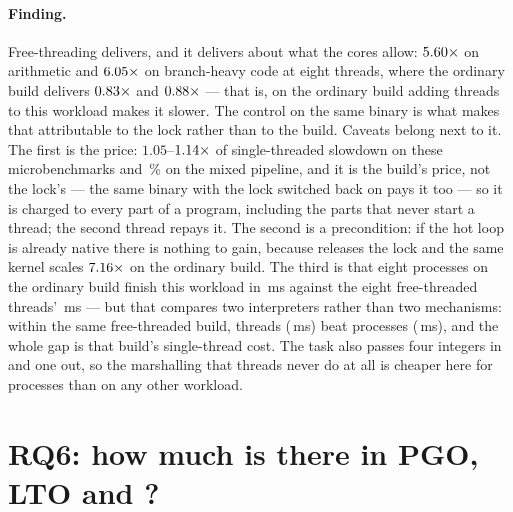 \paragraph{Finding.} Free-threading delivers, and it delivers about what the cores allow:
$\meas{ratio:b4_threads-ft:py_arith/ft/T1_control|b4_threads-ft:py_arith/ft/T8}{5.60}\times$ on arithmetic and $\meas{ratio:b4_threads-ft:py_branchy/ft/T1|b4_threads-ft:py_branchy/ft/T8}{6.05}\times$ on branch-heavy code at eight threads, where the
ordinary build delivers $\meas{ratio:b4_threads-gil:py_arith/gil/T1_control|b4_threads-gil:py_arith/gil/T8}{0.83}\times$ and $\meas{ratio:b4_threads-gil:py_branchy/gil/T1_control|b4_threads-gil:py_branchy/gil/T8}{0.88}\times$ --- that is, on the ordinary build adding
threads to this workload makes it slower. The  control on the same binary is
what makes that attributable to the lock rather than to the build. Caveats belong next to
it. The first is the price: $1.05$--$\meas{ratio:b4_threads-ft:single_thread_arith/ft|b4_threads-gil:single_thread_arith/gil}{1.14}\times$ of single-threaded slowdown on these microbenchmarks and
\,\% on the mixed pipeline, and it is the build's price, not the lock's --- the same binary
with the lock switched back on pays it too --- so it is charged to every part of a program,
including the parts that never start a thread; the second thread repays it. The second is a
precondition: if the hot loop is already native there is nothing to gain, because
 releases the lock and the same kernel scales $\meas{ratio:b4_threads-gil:c_ffi_uniform/gil/T1|b4_threads-gil:c_ffi_uniform/gil/T8}{7.16}\times$ on the ordinary build.
The third is that eight processes on the ordinary build finish this workload in \,ms
against the eight free-threaded threads' \,ms --- but that compares two interpreters rather
than two mechanisms: within the same free-threaded build, threads (\,ms) beat processes
(\,ms), and the whole gap is that build's single-thread cost. The task also passes four
integers in and one out, so the marshalling that threads never do at all is cheaper here for
processes than on any other workload.

\section{RQ6: how much is there in PGO, LTO and ?}
\label{sec:rq6}

